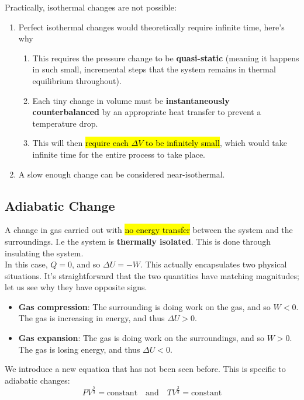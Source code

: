\documentclass[a4paper,12pt]{article}
\newcommand{\eqand}{\quad \text{and} \quad}
\newcommand{\lb}{\\[8pt]}
\begin{document}
\pagebreak

Practically, isothermal changes are not possible:
\begin{enumerate}
  \item Perfect isothermal changes would theoretically require infinite time, here's why
        \begin{enumerate}
          \item This requires the pressure change to be \textbf{quasi-static} (meaning it happens in such small, incremental steps that the system remains in thermal equilibrium throughout).
          \item Each tiny change in volume must be \textbf{instantaneously counterbalanced} by an appropriate heat transfer to prevent a temperature drop.
          \item This will then \hl{require each $\Delta V$ to be infinitely small}, which would take infinite time for the entire process to take place.
        \end{enumerate}
  \item A slow enough change can be considered near-isothermal.
\end{enumerate}

\subsection{Adiabatic Change}

A change in gas carried out with \hl{no energy transfer} between the system and the surroundings. I.e the system is \textbf{thermally isolated}. This is done through insulating the system.\lb
In this case, $Q = 0$, and so $\Delta U = -W$. This actually encapsulates two physical situations. It's straightforward that the two quantities have matching magnitudes; let us see why they have opposite signs.
\begin{itemize}
  \item \textbf{Gas compression}: The surrounding is doing work on the gas, and so $W < 0$. The gas is increasing in energy, and thus $\Delta U > 0$.
  \item \textbf{Gas expansion}: The gas is doing work on the surroundings, and so $W > 0$. The gas is losing energy, and thus $\Delta U < 0$.
\end{itemize}

We introduce a new equation that has not been seen before. This is specific to adiabatic changes:
\begin{equation}\label{eq:adiabatic}
  PV^{\frac{5}{3}} = \text{constant} \eqand TV^{\frac{2}{3}} = \text{constant}
\end{equation}
\end{document}
